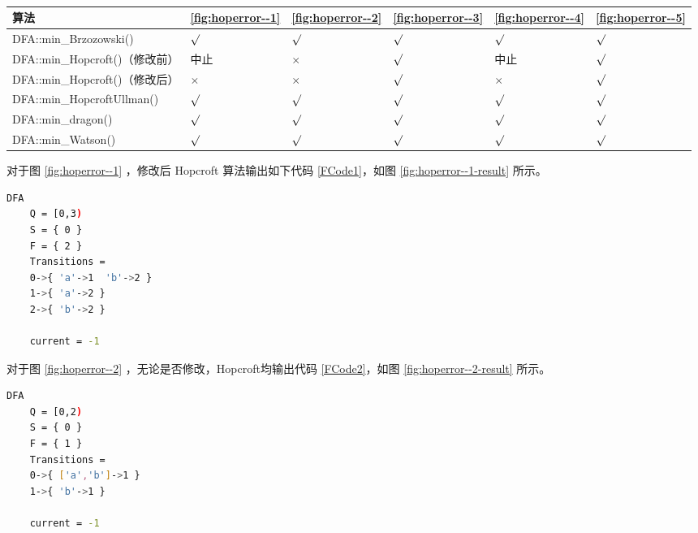 \begin{table}[!htbp]
    \caption{  }
    \label{tab:KeepMinResultofAll}
    \centering
    \small%
    \setlength{\tabcolsep}{4pt}%
    \renewcommand{\arraystretch}{1.2}%
    \begin{tabular}{l|p{4em}<{\centering} p{4em}<{\centering} p{4em}<{\centering} p{4em}<{\centering} p{4em}<{\centering} }  %
        \toprule %
        算法 & \ref{fig:hoperror--1} & \ref{fig:hoperror--2} & \ref{fig:hoperror--3} & \ref{fig:hoperror--4} &  \ref{fig:hoperror--5}  \\
        \midrule
        DFA::min\_Brzozowski()        & $\surd$ & $\surd$ & $\surd$ & $\surd$     & $\surd$        \\
        DFA::min\_Hopcroft()（修改前） & 中止    & $\times$ & $\surd$ & 中止        & $\surd$       \\
        DFA::min\_Hopcroft()（修改后） & $\times$& $\times$& $\surd$ & $\times$    & $\surd$       \\
        DFA::min\_HopcroftUllman()    & $\surd$ & $\surd$ & $\surd$ & $\surd$     & $\surd$       \\
        DFA::min\_dragon()            & $\surd$ & $\surd$ & $\surd$ & $\surd$     & $\surd$       \\
        DFA::min\_Watson()            & $\surd$ & $\surd$ & $\surd$ & $\surd$     & $\surd$       \\
        \bottomrule%
    \end{tabular}
\end{table}

\newpage
对于图 \ref{fig:hoperror--1} ，修改后 Hopcroft 算法输出如下代码 \ref{FCode1}，如图 \ref{fig:hoperror--1-result} 所示。

\begin{lstlisting}[language=bash,label={FCode1},caption={图 \ref{fig:hoperror--1} 输出}]
    DFA
    Q = [0,3)
    S = { 0 }
    F = { 2 }
    Transitions =
    0->{ 'a'->1  'b'->2 }
    1->{ 'a'->2 }
    2->{ 'b'->2 }

    current = -1
\end{lstlisting}
 
对于图 \ref{fig:hoperror--2} ，无论是否修改，Hopcroft均输出代码 \ref{FCode2}，如图 \ref{fig:hoperror--2-result} 所示。
\begin{lstlisting}[language=bash,label={FCode2},caption={图 \ref{fig:hoperror--2} 输出}]
    DFA
    Q = [0,2)
    S = { 0 }
    F = { 1 }
    Transitions =
    0->{ ['a','b']->1 }
    1->{ 'b'->1 }

    current = -1
\end{lstlisting}

